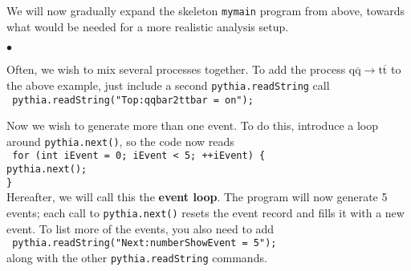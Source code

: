 \documentclass[12pt,a4paper]{article}
\newcommand{\q}{{\mathrm q}}
\renewcommand{\t}{{\mathrm t}}
\newcommand{\qbar}{\overline{\mathrm q}}
\newcommand{\tbar}{\overline{\mathrm t}}
\newenvironment{Itemize}{\begin{list}{$\bullet$}%
{\setlength{\topsep}{0.4mm}\setlength{\partopsep}{0.4mm}%
\setlength{\itemsep}{0.4mm}\setlength{\parsep}{0.4mm}}}%
{\end{list}}
\begin{document}
We will now gradually expand the skeleton \texttt{mymain} program from
above, towards what would be needed for a more realistic analysis setup.
\begin{Itemize}
\item Often, we wish to mix several processes together. 
To add the process $\q \qbar \to \t \tbar$ to the above example, 
just include a second \texttt{pythia.readString} call\\
\texttt{
\hspace*{10mm} pythia.readString("Top:qqbar2ttbar = on");
}
\item Now we wish to generate more than one event. To do this, introduce a
loop around \texttt{pythia.next()}, so the
code now reads\\
\texttt{
\hspace*{10mm} for (int iEvent = 0; iEvent < 5; ++iEvent) \{ \\
\hspace*{15mm}   pythia.next(); \\
\hspace*{10mm} \} } \\
Hereafter, we will call this the \textbf{event loop}. The program will
now generate 5 events; each call to \texttt{pythia.next()} 
resets the event record and fills it with a new event. To list
more of the events, you also need to add\\
\texttt{
\hspace*{10mm} pythia.readString("Next:numberShowEvent = 5");
}\\
along with the other \texttt{pythia.readString} commands. 


\end{Itemize}
\end{document}
